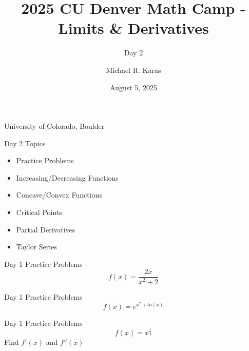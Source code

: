 \documentclass[aspectratio=169]{beamer}
\title{2025 CU Denver Math Camp - Limits \& Derivatives}
\subtitle{Day 2}
\date{August 5, 2025}
\author{Michael R. Karas}
\begin{document}
\begin{frame}
\maketitle

{\footnotesize University of Colorado, Boulder}
\end{frame}

\begin{frame}{Day 2 Topics}\label{main1}

\begin{itemize}
	\begin{itemize}
		\item Practice Problems		
		\item Increasing/Decreasing Functions
		\item Concave/Convex Functions
		\item Critical Points
		\item Partial Derivatives
		\item Taylor Series
	\end{itemize}
\end{itemize}
\end{frame}

\begin{frame}{Day 1 Practice Problems}\label{main1}
	\vspace{-4cm}
    \[
    f(x) = \frac{2x}{x^{2}+2}
    \]
\end{frame}

\begin{frame}{Day 1 Practice Problems}\label{main1}
	\vspace{-4cm}
    \[
    f(x) = e^{x^{2} + ln(x)}
    \]
\end{frame}

\begin{frame}{Day 1 Practice Problems}\label{main1}
	\vspace{-4cm}
    \[
    f(x) = x^{\frac{1}{4}}
    \]
    Find \( f'(x) \) and \( f''(x) \)
\end{frame}
\end{document}
